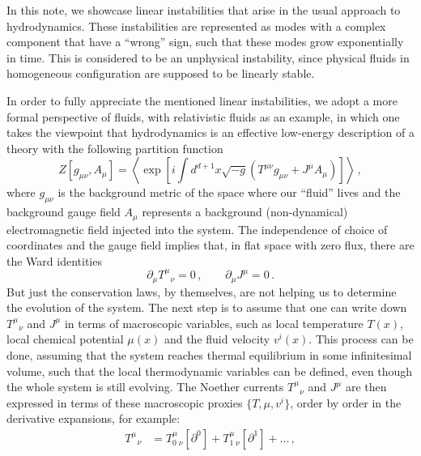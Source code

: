 \documentclass[superscriptaddress,prd,nofootinbib,preprintnumbers,longbibliography,11pt,eqsecnum]{revtex4-1}
\def\la{\langle}
\def\ra{\rangle}
\def\d{\partial}
\begin{document}
In this note, we showcase linear instabilities that arise in the usual approach to hydrodynamics. These instabilities are represented as modes with a complex component that have a ``wrong'' sign, such that these modes grow exponentially in time. This is considered to be an unphysical instability, since physical fluids in homogeneous configuration are supposed to be linearly stable.

In order to fully appreciate the mentioned linear instabilities, we adopt a more formal perspective of fluids, with relativistic fluids as an example, in which one takes the viewpoint that hydrodynamics is an effective low-energy description of a theory with the following partition function 
\begin{equation}
  Z[g_{\mu \nu},A_\mu] = \left\la \exp\left[i \int d^{d+1}x\sqrt{-g}\left( T^{\mu \nu}g_{\mu \nu} + J^\mu A_\mu\right)  \right] \right\ra
  \,,
\end{equation}
where $g_{\mu \nu}$ is the background metric of the space where our ``fluid'' lives and the background gauge field $A_\mu$ represents a background (non-dynamical) electromagnetic field injected into the system. The independence of choice of coordinates and the gauge field implies that, in flat space with zero flux, there are the Ward identities 
\begin{equation}\label{eq:WardIdentity}
  \d_\mu T^{\mu}_{\;\;\,\nu} =0\,,\qquad \d_\mu J^\mu = 0\, .
\end{equation}
But just the conservation laws, by themselves, are not helping us to determine the evolution of the system. The next step is to assume that one can write down $T^{\mu}_{\;\;\,\nu}$ and $J^\mu$ in terms of macroscopic variables, such as local temperature $T(x)$, local chemical potential $\mu(x)$ and the fluid velocity $v^i(x)$. This process can be done, assuming that the system reaches thermal equilibrium in some infinitesimal volume, such that the local thermodynamic variables can be defined, even though the whole system is still evolving. The Noether currents $T^{\mu}_{\;\;\, \nu}$ and $J^\mu$ are then expressed in terms of these macroscopic proxies $\{T,\mu, v^i \}$, order by order in the derivative expansions, for example: 
\begin{equation}
\begin{aligned}
  T^{\mu}_{\;\;\,\nu} &= T^{\mu}_{0\;\nu} [\d^0] + T^{\mu}_{1\;\nu}[\d^1]+... \, ,\\
  \end{aligned}
\end{equation}
\end{document}
